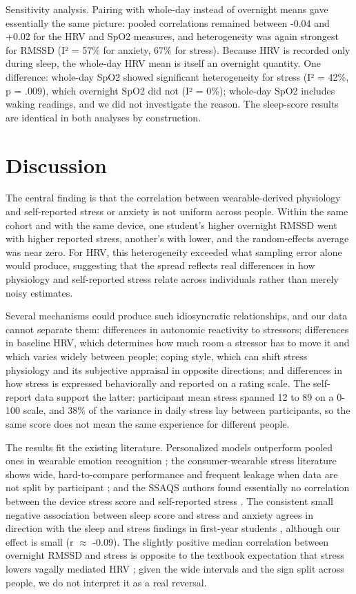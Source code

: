 \documentclass[11pt, a4paper, oneside]{article}
\begin{document}
Sensitivity analysis. Pairing with whole-day instead of overnight means gave essentially the same picture: pooled correlations remained between -0.04 and +0.02 for the HRV and SpO2 measures, and heterogeneity was again strongest for RMSSD (I² = 57\% for anxiety, 67\% for stress). Because HRV is recorded only during sleep, the whole-day HRV mean is itself an overnight quantity. One difference: whole-day SpO2 showed significant heterogeneity for stress (I² = 42\%, p = .009), which overnight SpO2 did not (I² = 0\%); whole-day SpO2 includes waking readings, and we did not investigate the reason. The sleep-score results are identical in both analyses by construction.

\section{Discussion}

The central finding is that the correlation between wearable-derived physiology and self-reported stress or anxiety is not uniform across people. Within the same cohort and with the same device, one student's higher overnight RMSSD went with higher reported stress, another's with lower, and the random-effects average was near zero. For HRV, this heterogeneity exceeded what sampling error alone would produce, suggesting that the spread reflects real differences in how physiology and self-reported stress relate across individuals rather than merely noisy estimates.

Several mechanisms could produce such idiosyncratic relationships, and our data cannot separate them: differences in autonomic reactivity to stressors; differences in baseline HRV, which determines how much room a stressor has to move it and which varies widely between people; coping style, which can shift stress physiology and its subjective appraisal in opposite directions; and differences in how stress is expressed behaviorally and reported on a rating scale. The self-report data support the latter: participant mean stress spanned 12 to 89 on a 0-100 scale, and 38\% of the variance in daily stress lay between participants, so the same score does not mean the same experience for different people.

The results fit the existing literature. Personalized models outperform pooled ones in wearable emotion recognition \cite{reference_5}; the consumer-wearable stress literature shows wide, hard-to-compare performance and frequent leakage when data are not split by participant \cite{reference_4}; and the SSAQS authors found essentially no correlation between the device stress score and self-reported stress \cite{reference_9}. The consistent small negative association between sleep score and stress and anxiety agrees in direction with the sleep and stress findings in first-year students \cite{reference_6}, although our effect is small (r $\approx$ -0.09). The slightly positive median correlation between overnight RMSSD and stress is opposite to the textbook expectation that stress lowers vagally mediated HRV \cite{reference_10, reference_11}; given the wide intervals and the sign split across people, we do not interpret it as a real reversal.
\end{document}

